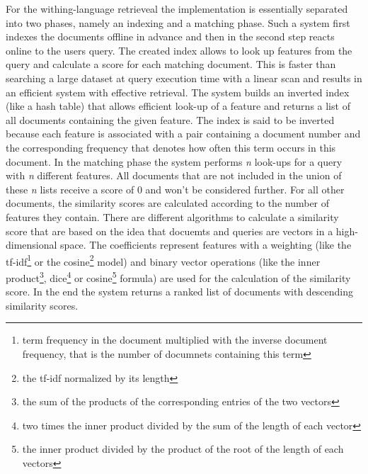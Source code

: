 \documentclass[journal]{IEEEtran}
\begin{document}
For the withing-language retrieveal the implementation is essentially separated into two phases, namely an indexing and a matching phase.
Such a system first indexes the documents offline in advance and then in the second step reacts online to the users query.
The created index allows to look up features from the query and calculate a score for each matching document.
This is faster than searching a large dataset at query execution time with a linear scan and results in an efficient system with effective retrieval.
The system builds an inverted index (like a hash table) that allows efficient look-up of a feature and returns a list of all documents containing the given feature.
The index is said to be inverted because each feature is associated with a pair containing a document number and the corresponding frequency that denotes how often this term occurs in this document.
In the matching phase the system performs {\it n} look-ups for a query with {\it n} different features.
All documents that are not included in the union of these {\it n} lists receive a score of 0 and won't be considered further.
For all other documents, the similarity scores are calculated according to the number of features they contain.
There are different algorithms to calculate a similarity score that are based on the idea that docuemts and queries are vectors in a high-dimensional space.
The coefficients represent features with a weighting (like the tf-idf\footnote{term frequency in the document multiplied with the inverse document frequency, that is the number of documnets containing this term} or the cosine\footnote{the tf-idf normalized by its length} model) and binary vector operations (like the inner product\footnote{the sum of the products of the corresponding entries of the two vectors}, dice\footnote{two times the inner product divided by the sum of the length of each vector} or cosine\footnote{the inner product divided by the product of the root of the length of each vectors} formula) are used for the calculation of the similarity score.
In the end the system returns a ranked list of documents with descending similarity scores.
\end{document}
